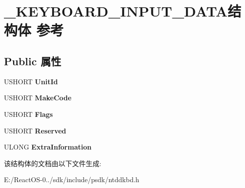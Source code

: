 \hypertarget{struct___k_e_y_b_o_a_r_d___i_n_p_u_t___d_a_t_a}{}\section{\+\_\+\+K\+E\+Y\+B\+O\+A\+R\+D\+\_\+\+I\+N\+P\+U\+T\+\_\+\+D\+A\+T\+A结构体 参考}
\label{struct___k_e_y_b_o_a_r_d___i_n_p_u_t___d_a_t_a}
\subsection*{Public 属性}
\begin{DoxyCompactItemize}
\item 
\mbox{\label{struct___k_e_y_b_o_a_r_d___i_n_p_u_t___d_a_t_a_a457a274f23e7be1a755268e89cc39f15}} 
U\+S\+H\+O\+RT {\bfseries Unit\+Id}
\item 
\mbox{\label{struct___k_e_y_b_o_a_r_d___i_n_p_u_t___d_a_t_a_aa327e5d13c7aa1abfbc05d75f4aa1257}} 
U\+S\+H\+O\+RT {\bfseries Make\+Code}
\item 
\mbox{\label{struct___k_e_y_b_o_a_r_d___i_n_p_u_t___d_a_t_a_ab73c080d5bc496ba55c9a7f07a46c293}} 
U\+S\+H\+O\+RT {\bfseries Flags}
\item 
\mbox{\label{struct___k_e_y_b_o_a_r_d___i_n_p_u_t___d_a_t_a_a4c08332dc75845ca964130cf0ab7229b}} 
U\+S\+H\+O\+RT {\bfseries Reserved}
\item 
\mbox{\label{struct___k_e_y_b_o_a_r_d___i_n_p_u_t___d_a_t_a_a3cadc60df1a3eea7637f377108c8801a}} 
U\+L\+O\+NG {\bfseries Extra\+Information}
\end{DoxyCompactItemize}


该结构体的文档由以下文件生成\+:\begin{DoxyCompactItemize}
\item 
E\+:/\+React\+O\+S-\/0../sdk/include/psdk/ntddkbd.\+h\end{DoxyCompactItemize}
